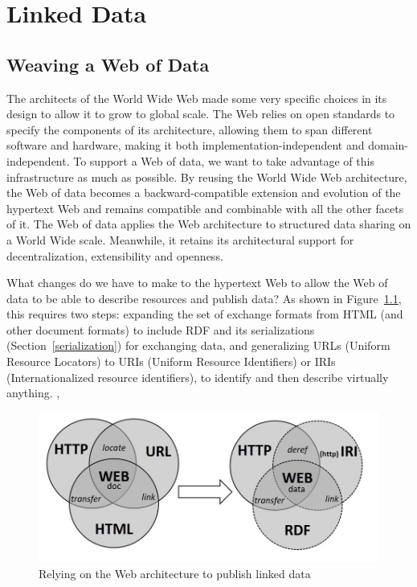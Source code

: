 \chapter{Linked Data}
\label{ch5}

\section{Weaving a Web of Data}



The architects  of the World Wide Web made some very specific choices in its design 
to allow it to grow to global scale.   The  Web relies on open standards to specify the components of its
architecture, allowing them to span different software and hardware, making it both implementation-independent and domain-independent. To
support a Web of data, we want to take advantage of this infrastructure as much as possible. 
By
reusing  the World Wide Web architecture, the Web of data
becomes a backward-compatible extension and evolution of the hypertext
Web and remains compatible and combinable with all the other facets of
it. The Web of data applies the Web architecture to structured data
sharing on a World Wide scale. Meanwhile, it retains its architectural
support for decentralization, extensibility and openness.


What changes do we have to make to the hypertext Web to allow the Web of data
to be able to describe  resources and publish data? As
shown in Figure~\ref{fig:ch5.1}, this requires two steps:  expanding the set of exchange formats from     HTML (and other document formats) to include  RDF and its serializations (Section~\ref{serialization}) for exchanging data, and generalizing 
URLs (Uniform Resource Locators) to URIs (Uniform Resource Identifiers) 
or IRIs (Internationalized resource identifiers), to identify and then describe virtually anything. ,

\begin{figure}
    \centering
    \includegraphics[width=5.0in]{media/ch5/figure-05-01.jpg}
    \caption{Relying on the Web architecture to publish linked data}
    \label{fig:ch5.1}
\end{figure}


